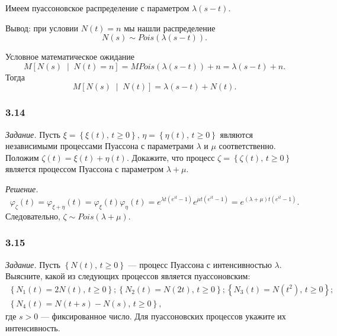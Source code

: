 Имеем пуассоновское распределение с параметром $ \lambda \left( s - t \right) $.

Вывод: при условии $N \left( t \right) = n$ мы нашли распределение
$$N \left( s \right) \sim Pois \left( \lambda \left( s - t \right) \right).$$

Условное математическое ожидание
$$M \left[ N \left( s \right) \; \middle| \; N \left( t \right) = n \right] =
  MPois \left( \lambda \left( s - t \right) \right) + n =
  \lambda \left( s - t \right) + n.$$
Тогда
$$M \left[ N \left( s \right) \; \middle| \; N \left( t \right) \right] =
  \lambda \left( s - t \right) + N \left( t \right).$$

\subsubsection*{3.14}
\textit{Задание.}
Пусть
$ \xi = \left\{ \xi \left( t \right), \, t \geq 0 \right\}, \,
  \eta = \left\{ \eta \left( t \right), \, t \geq 0 \right\} $
являются независимыми процессами Пуассона с параметрами $ \lambda $ и $ \mu $ соответственно.
Положим $ \zeta \left( t \right) = \xi \left( t \right) + \eta \left( t \right) $.
Докажите, что процесс $ \zeta = \left\{ \zeta \left( t \right), \, t \geq 0 \right\} $
является процессом Пуассона с параметром $ \lambda + \mu $.

\textit{Решение.}
$$ \varphi_{ \zeta } \left( t \right) =
  \varphi_{ \xi + \eta } \left( t \right) =
  \varphi_{ \xi } \left( t \right) \varphi_{ \eta } \left( t \right) =
  e^{ \lambda t \left( e^{it} - 1 \right) } e^{ \mu t \left( e^{it} - 1 \right) } =
  e^{ \left( \lambda + \mu \right) t \left( e^{it} - 1 \right) }.$$
Следовательно, $ \zeta \sim Pois \left( \lambda + \mu \right) $.

\subsubsection*{3.15}

\textit{Задание.}
Пусть $ \left\{ N \left( t \right), \, t \geq 0 \right\} $ ---
процесс Пуассона с интенсивностью $ \lambda $.
Выясните, какой из следующих процессов является пуассоновским:
\begin{gather*}
  \left\{ N_1 \left( t \right) = 2N \left( t \right), \, t \geq 0 \right\};
  \left\{ N_2 \left( t \right) = N \left( 2t \right), \, t \geq 0 \right\};
  \left\{ N_3 \left( t \right) = N \left( t^2 \right), \, t \geq 0 \right\}; \\
  \left\{ N_4 \left( t \right) = N \left( t + s \right) - N \left( s \right), \, t \geq 0 \right\},
\end{gather*}
где $s > 0$ --- фиксированное число.
Для пуассоновских процессов укажите их интенсивность.

